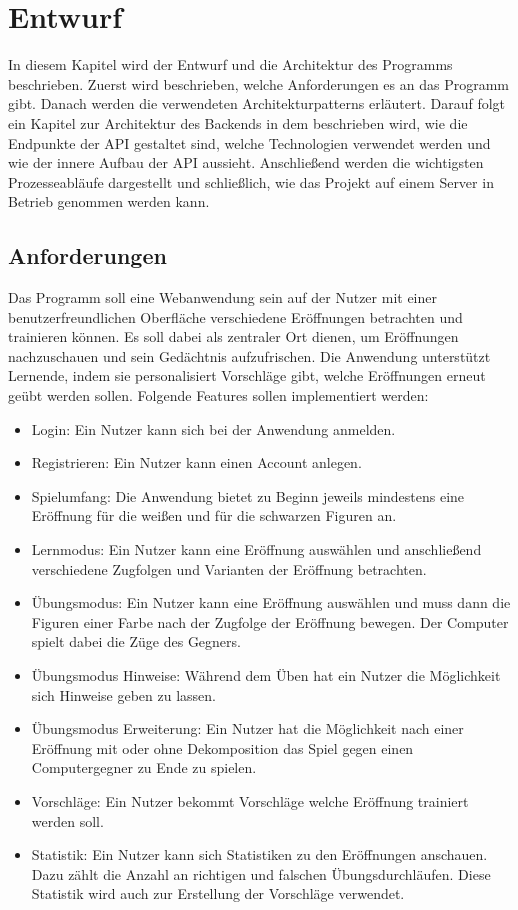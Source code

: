 
\chapter{Entwurf} %
In diesem Kapitel wird der Entwurf und die Architektur des Programms beschrieben. Zuerst wird beschrieben, welche Anforderungen es an das Programm gibt. Danach werden die verwendeten Architekturpatterns erläutert. Darauf folgt ein Kapitel zur Architektur des Backends in dem beschrieben wird, wie die Endpunkte der API gestaltet sind, welche Technologien verwendet werden und wie der innere Aufbau der API aussieht. Anschließend werden die wichtigsten Prozesseabläufe dargestellt und schließlich, wie das Projekt auf einem Server in Betrieb genommen werden kann.

\section{Anforderungen}
Das Programm soll eine Webanwendung sein auf der Nutzer mit einer benutzerfreundlichen Oberfläche verschiedene Eröffnungen betrachten und trainieren können. Es soll dabei als zentraler Ort dienen, um Eröffnungen nachzuschauen und sein Gedächtnis aufzufrischen. Die Anwendung unterstützt Lernende, indem sie personalisiert Vorschläge gibt, welche Eröffnungen erneut geübt werden sollen. Folgende Features sollen implementiert werden:

\begin{itemize}
    \item Login: Ein Nutzer kann sich bei der Anwendung anmelden.
    \item Registrieren: Ein Nutzer kann einen Account anlegen.
    \item Spielumfang: Die Anwendung bietet zu Beginn jeweils mindestens eine Eröffnung für die weißen und für die schwarzen Figuren an.
    \item Lernmodus: Ein Nutzer kann eine Eröffnung auswählen und anschließend verschiedene Zugfolgen und Varianten der Eröffnung betrachten.
    \item Übungsmodus: Ein Nutzer kann eine Eröffnung auswählen und muss dann die Figuren einer Farbe nach der Zugfolge der Eröffnung bewegen. Der Computer spielt dabei die Züge des Gegners.
    \item Übungsmodus Hinweise: Während dem Üben hat ein Nutzer die Möglichkeit sich Hinweise geben zu lassen.
    \item Übungsmodus Erweiterung: Ein Nutzer hat die Möglichkeit nach einer Eröffnung mit oder ohne Dekomposition das Spiel gegen einen Computergegner zu Ende zu spielen.
    \item Vorschläge: Ein Nutzer bekommt Vorschläge welche Eröffnung trainiert werden soll.
    \item Statistik: Ein Nutzer kann sich Statistiken zu den Eröffnungen anschauen. Dazu zählt die Anzahl an richtigen und falschen Übungsdurchläufen. Diese Statistik wird auch zur Erstellung der Vorschläge verwendet.
\end{itemize}

